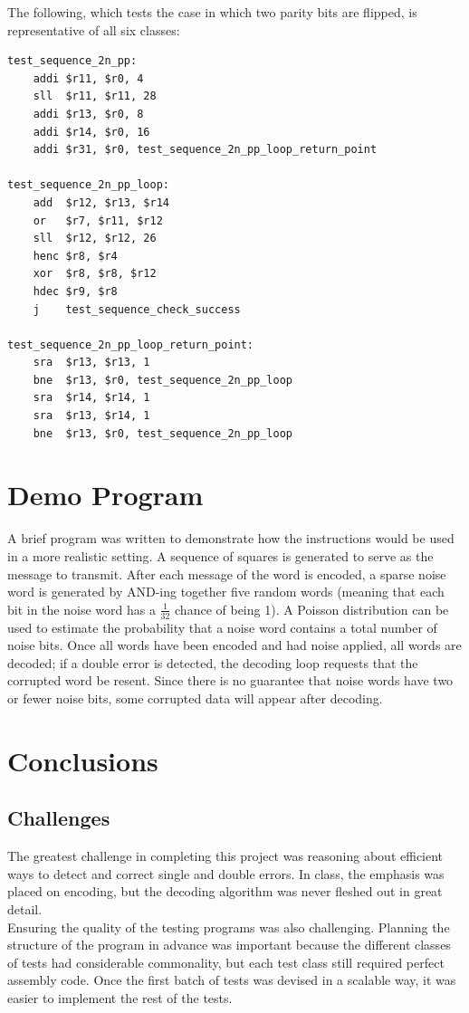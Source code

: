 \documentclass[letterpaper]{article} %
\begin{document}
\noindent
The following, which tests the case in which two parity bits are flipped, is representative of all six classes:
\begin{lstlisting}
test_sequence_2n_pp:
	addi $r11, $r0, 4
	sll  $r11, $r11, 28
	addi $r13, $r0, 8
	addi $r14, $r0, 16
	addi $r31, $r0, test_sequence_2n_pp_loop_return_point
	
test_sequence_2n_pp_loop:
	add  $r12, $r13, $r14
	or   $r7, $r11, $r12
	sll  $r12, $r12, 26
	henc $r8, $r4
	xor  $r8, $r8, $r12
	hdec $r9, $r8
	j    test_sequence_check_success

test_sequence_2n_pp_loop_return_point:
	sra  $r13, $r13, 1
	bne  $r13, $r0, test_sequence_2n_pp_loop
	sra  $r14, $r14, 1
	sra  $r13, $r14, 1
	bne  $r13, $r0, test_sequence_2n_pp_loop
\end{lstlisting}

\section{Demo Program}
A brief program was written to demonstrate how the instructions would be used in a more realistic setting. A sequence of squares is generated to serve as the message to transmit. After each message of the word is encoded, a sparse noise word is generated by AND-ing together five random words (meaning that each bit in the noise word has a $\frac{1}{32}$ chance of being 1). A Poisson distribution can be used to estimate the probability that a noise word contains a total number of noise bits. Once all words have been encoded and had noise applied, all words are decoded; if a double error is detected, the decoding loop requests that the corrupted word be resent. Since there is no guarantee that noise words have two or fewer noise bits, some corrupted data will appear after decoding.

\section{Conclusions}
\subsection{Challenges}
The greatest challenge in completing this project was reasoning about efficient ways to detect and correct single and double errors. In class, the emphasis was placed on encoding, but the decoding algorithm was never fleshed out in great detail.\\

\noindent
Ensuring the quality of the testing programs was also challenging. Planning the structure of the program in advance was important because the different classes of tests had considerable commonality, but each test class still required perfect assembly code. Once the first batch of tests was devised in a scalable way, it was easier to implement the rest of the tests.
\end{document}
